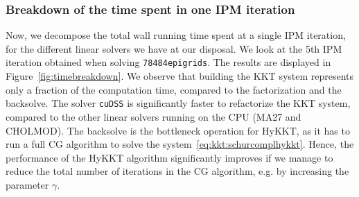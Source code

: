 \begin{table}[!ht]
  \centering
  \label{tab:sckkt:performance}
  \caption{TO UPDATE XXX Performance of the equality-relaxation
    strategy as we decrease the IPM tolerance $\varepsilon_{tol}$.
    The table displays the wall time on the CPU (using CHOLMOD)
    and on the GPU (using cuDSS). We display the
    relative errors on the objective $\delta_{obj} = (f(x_{hsl}^\sharp) - f(x_{sc}^\sharp))/f(x_{hsl}^\sharp)$
    and on the primal solution $\delta_x = \|x_{hsl}^\sharp - x_{sc}^\sharp\|_\infty
    / \|x_{hsl}^\sharp\|_\infty$. (A30 GPU)
  }
\end{table}


\subsubsection{Breakdown of the time spent in one IPM iteration}
Now, we decompose the total wall running time spent at a single
IPM iteration, for the different linear solvers we have at our disposal.
We look at the 5th IPM iteration obtained when solving {\tt 78484epigrids}.
The results are displayed in Figure~\ref{fig:timebreakdown}. We observe
that building the KKT system represents only a fraction of the computation time, compared
to the factorization and the backsolve. The solver {\tt cuDSS} is significantly
faster to refactorize the KKT system, compared to the other linear solvers running on the CPU (MA27 and CHOLMOD).
The backsolve is the bottleneck operation for HyKKT, as it has to run a
full CG algorithm to solve the system~\eqref{eq:kkt:schurcomplhykkt}. Hence, the performance
of the HyKKT algorithm significantly improves if we manage to reduce the total
number of iterations in the CG algorithm, e.g. by increasing the parameter $\gamma$.

